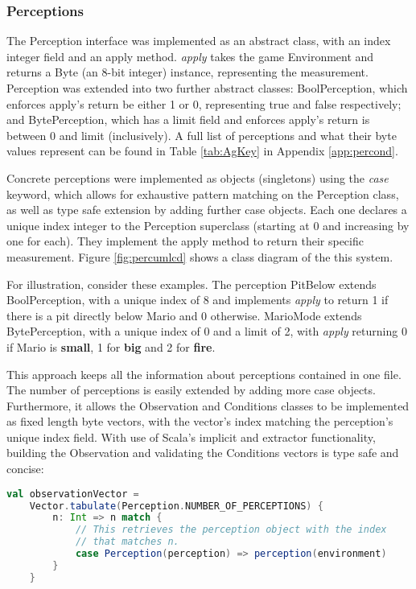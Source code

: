 \subsubsection{Perceptions}

The Perception interface was implemented as an abstract class, with an index integer field and an apply method. \emph{apply} takes the game Environment and returns a Byte (an 8-bit integer) instance, representing the measurement. Perception was extended into two further abstract classes: BoolPerception, which enforces apply's return be either 1 or 0, representing true and false respectively; and BytePerception, which has a limit field and enforces apply's return is between 0 and limit (inclusively). A full list of perceptions and what their byte values represent can be found in Table \ref{tab:AgKey} in Appendix \ref{app:percond}.

Concrete perceptions were implemented as objects (singletons) using the \emph{case} keyword, which allows for exhaustive pattern matching on the Perception class, as well as type safe extension by adding further case objects. Each one declares a unique index integer to the Perception superclass (starting at 0 and increasing by one for each). They implement the apply method to return their specific measurement. Figure \ref{fig:percumlcd} shows a class diagram of the this system.

For illustration, consider these examples. The perception PitBelow extends BoolPerception, with a unique index of 8 and implements \emph{apply} to return 1 if there is a pit directly below Mario and 0 otherwise. MarioMode extends BytePerception, with a unique index of 0 and a limit of 2, with \emph{apply} returning 0 if Mario is \textbf{small}, 1 for \textbf{big} and 2 for \textbf{fire}.

This approach keeps all the information about perceptions contained in one file. The number of perceptions is easily extended by adding more case objects. Furthermore, it allows the Observation and Conditions classes to be implemented as fixed length byte vectors, with the vector's index matching the perception's unique index field. With use of Scala's implicit and extractor functionality, building the Observation and validating the Conditions vectors is type safe and concise:


\begin{minipage}{0.9\linewidth}
\centering
\begin{lstlisting}[language=scala]
val observationVector = 
    Vector.tabulate(Perception.NUMBER_OF_PERCEPTIONS) {
        n: Int => n match {
            // This retrieves the perception object with the index
            // that matches n. 
            case Perception(perception) => perception(environment)
        }
    }
\end{lstlisting}
\end{minipage}

